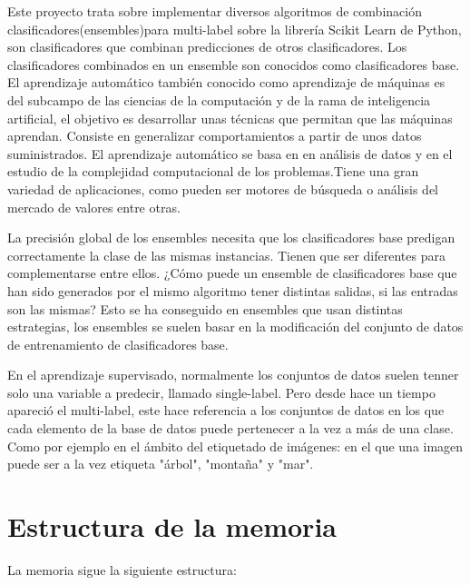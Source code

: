 
Este proyecto trata sobre implementar diversos algoritmos de combinación clasificadores(ensembles)para multi-label sobre la librería Scikit Learn de Python, son clasificadores que combinan predicciones de otros clasificadores. Los clasificadores combinados en un ensemble son conocidos como clasificadores base.
El aprendizaje automático también conocido como aprendizaje de máquinas es del subcampo de las ciencias de la computación y de la rama de inteligencia artificial, el objetivo es desarrollar unas técnicas que permitan que las máquinas aprendan. Consiste en generalizar comportamientos a partir de unos datos suministrados. El aprendizaje automático se basa en en análisis de datos y en el estudio de la complejidad computacional de los problemas.Tiene una gran variedad de aplicaciones, como pueden ser motores de búsqueda o análisis del mercado de valores entre otras.

La precisión global de los ensembles necesita que los clasificadores base predigan correctamente la clase de las mismas instancias. Tienen que ser diferentes para complementarse entre ellos. ¿Cómo puede un ensemble de clasificadores base que han sido generados por el mismo algoritmo tener distintas salidas, si las entradas son las mismas? Esto se ha conseguido en ensembles que usan distintas estrategias, los ensembles se suelen basar en la modificación del conjunto de datos de entrenamiento de clasificadores base. 

En el aprendizaje supervisado, normalmente los conjuntos de datos suelen tenner solo una variable a predecir, llamado single-label. Pero desde hace un tiempo apareció el multi-label, este hace referencia a los conjuntos de datos en los que cada elemento de la base de datos puede pertenecer a la vez a más de una clase. Como por ejemplo en el ámbito del etiquetado de imágenes: en el que una imagen puede ser a la vez etiqueta "árbol", "montaña" y "mar".

\section{Estructura de la memoria}\label{estructura-de-la-memoria}

La memoria sigue la siguiente estructura:

